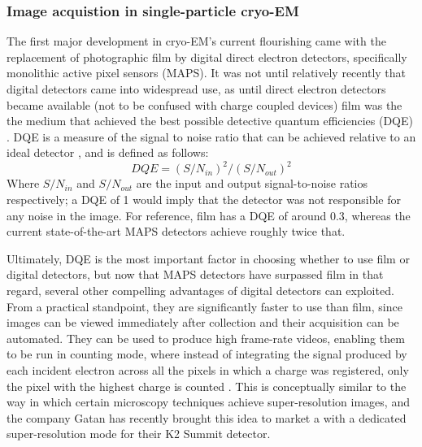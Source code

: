 \documentclass[a4paper,11pt,twoside,openright]{scrbook}
\begin{document}
\subsubsection{Image acquistion in single-particle cryo-EM}
The first major development in cryo-EM's current flourishing came with the replacement of photographic film by digital direct electron detectors, specifically monolithic active pixel sensors (MAPS). It was not until relatively recently that digital detectors came into widespread use, as until direct electron detectors became available (not to be confused with charge coupled devices) film was the the medium that achieved the best possible detective quantum efficiencies (DQE) \cite{McMullan2009}. DQE is a measure of the signal to noise ratio that can be achieved relative to an ideal detector \cite{Dainty1975}, and is defined as follows:
\begin{displaymath}
    DQE = (S/N_{in})^{2}/(S/N_{out})^{2}
\end{displaymath}
Where \begin{math} S/N_{in} \end{math} and \begin{math} S/N_{out} \end{math} are the input and output signal-to-noise ratios respectively; a DQE of 1 would imply that the detector was not responsible for any noise in the image. For reference, film has a DQE of around 0.3, whereas the current state-of-the-art MAPS detectors achieve roughly twice that.

Ultimately, DQE is the most important factor in choosing whether to use film or digital detectors, but now that MAPS detectors have surpassed film in that regard, several other compelling advantages of digital detectors can exploited. From a practical standpoint, they are significantly faster to use than film, since images can be viewed immediately after collection and their acquisition can be automated. They can be used to produce high frame-rate videos, enabling them to be run in counting mode, where instead of integrating the signal produced by each incident electron across all the pixels in which a charge was registered, only the pixel with the highest charge is counted \cite{McMullan2009a}. This is conceptually similar to the way in which certain microscopy techniques achieve super-resolution images, and the company Gatan has recently brought this idea to market a with a dedicated super-resolution mode for their K2 Summit detector.
\end{document}
